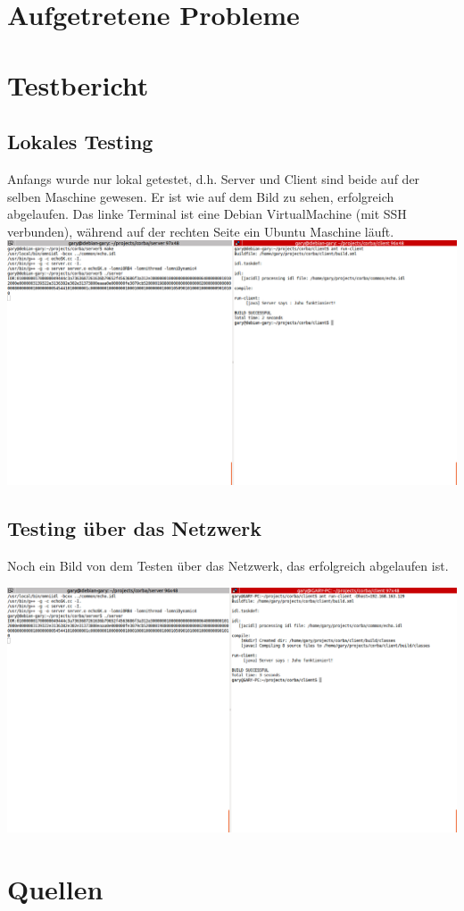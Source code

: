 \documentclass[11pt]{article}
\begin{document}
\section{Aufgetretene Probleme}

\section{Testbericht}

\subsection{Lokales Testing}

Anfangs wurde nur lokal getestet, d.h. Server und Client sind beide auf der selben Maschine gewesen. Er ist wie auf dem Bild zu sehen, erfolgreich abgelaufen. Das linke Terminal ist eine Debian VirtualMachine (mit SSH verbunden), während auf der rechten Seite ein Ubuntu Maschine läuft.
\includegraphics[trim=0cm 5cm 0cm 0cm, clip=true]{test_local}

\subsection{Testing über das Netzwerk}

Noch ein Bild von dem Testen über das Netzwerk, das erfolgreich abgelaufen ist.

\includegraphics[scale=0.5]{test_network}

\section{Quellen}

\end{document}

